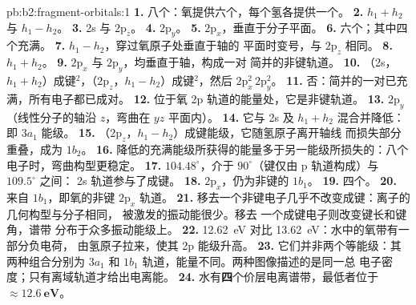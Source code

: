 \begin{solution}{pb:b2:fragment-orbitals:1}
\textbf{1.} 八个：氧提供六个，每个氢各提供一个。
\textbf{2.} $h_1 + h_2$ 与 $h_1 - h_2$。
\textbf{3.} 2s 与 $2\mathrm p_z$。
\textbf{4.} $2\mathrm p_y$。
\textbf{5.} $2\mathrm p_x$，垂直于分子平面。
\textbf{6.} 六个；其中四个充满。
\textbf{7.} $h_1 - h_2$，穿过氧原子处垂直于轴的
平面时变号，与 $2\mathrm p_z$ 相同。
\textbf{8.} $h_1 + h_2$。
\textbf{9.} $2\mathrm p_x$ 与 $2\mathrm p_y$，均垂直于轴，构成一对
简并的非键轨道。
\textbf{10.} （2s，$h_1 + h_2$）成键$^2$，（$2\mathrm p_z$，$h_1 - h_2$）成键$^2$，然后
$2\mathrm p_x^2\,2\mathrm p_y^2$。
\textbf{11.} 否：简并的一对已充满，所有电子都已成对。
\textbf{12.} 位于氧 2p 轨道的能量处，它是非键轨道。
\textbf{13.} $2\mathrm p_y$（线性分子的轴沿 $z$，弯曲在 $yz$ 平面内）。
\textbf{14.} 它与 2s 及 $h_1 + h_2$ 混合并降低：即 $3a_1$ 能级。
\textbf{15.} （$2\mathrm p_z$，$h_1 - h_2$）成键能级，它随氢原子离开轴线
而损失部分重叠，成为 $1b_2$。
\textbf{16.} 降低的充满能级所获得的能量多于另一能级所损失的：八个
电子时，弯曲构型更稳定。
\textbf{17.} $104.48^\circ$，介于 $90^\circ$（键仅由 p 轨道构成）与 $109.5^\circ$ 之间：
2s 轨道参与了成键。
\textbf{18.} $2\mathrm p_x$，仍为非键的 $1b_1$。
\textbf{19.} 四个。
\textbf{20.} 来自 $1b_1$，即氧的非键 $2\mathrm p_x$ 轨道。
\textbf{21.} 移去一个非键电子几乎不改变成键：离子的几何构型与分子相同，
被激发的振动能很少。移去
一个成键电子则改变键长和键角，谱带
分布于众多振动能级上。
\textbf{22.} \qty{12.62}{eV} 对比 \qty{13.62}{eV}：水中的氧带有一部分负电荷，
由氢原子拉来，使其 2p 能级升高。
\textbf{23.} 它们并非两个等能级：其两种组合分别为 $3a_1$ 和
$1b_1$ 轨道，能量不同。两种图像描述的是同一总
电子密度；只有离域轨道才给出电离能。
\textbf{24.} 水有\textbf{四}个价层电离谱带，最低者位于
$\boldsymbol{\approx \qty{12.6}{eV}}$。
\end{solution}

